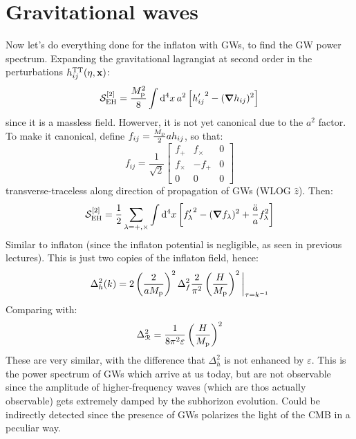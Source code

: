 \section{Gravitational waves}

Now let's do everything done for the inflaton with GWs, to find the GW power spectrum. Expanding the gravitational lagrangiat at second order in the perturbations $ h_{ij}^\text{TT}(\eta , \mathbf{x}) $:
\begin{equation*}
  \mathcal{S}_\text{EH}^{[2]} = \frac{M_\text{p}^2}{8} \int \mathrm{d}^4x \, a^2 \left[ {h_{ij}'}^2 - (\boldsymbol{\nabla} h_{ij})^2 \right]
\end{equation*}
since it is a massless field. Howerver, it is not yet canonical due to the $ a^2 $ factor. To make it canonical, define $ f_{ij} = \frac{M_\text{p}}{2} a h_{ij} $, so that:
\begin{equation*}
  f_{ij} = \frac{1}{\sqrt{2}}
  \begin{bmatrix}
    f_+ & f_\times & 0 \\
    f_\times & - f_+ & 0 \\
    0 & 0 & 0
  \end{bmatrix}
\end{equation*}
transverse-traceless along direction of propagation of GWs (WLOG $ \hat{z} $). Then:
\begin{equation*}
  \mathcal{S}_\text{EH}^{[2]} = \frac{1}{2} \sum_{\lambda = + , \times} \int \mathrm{d}^4x \left[ {f_\lambda'}^2 - (\boldsymbol{\nabla} f_\lambda)^2 + \frac{\ddot{a}}{a} f_\lambda^2 \right]
\end{equation*}
Similar to inflaton (since the inflaton potential is negligible, as seen in previous lectures). This is just two copies of the inflaton field, hence:
\begin{equation}
  \Delta^2_h(k) = 2 \left( \frac{2}{a M_\text{p}} \right)^2 \Delta^2_f \frac{2}{\pi^2} \left( \frac{H}{M_\text{p}} \right)^2 \bigg\vert_{\tau = k^{-1}}
\end{equation}
Comparing with:
\begin{equation*}
  \Delta^2_\EuScript{R} = \frac{1}{8 \pi^2 \varepsilon} \left( \frac{H}{M_\text{p}} \right)^2
\end{equation*}
These are very similar, with the difference that $ \Delta^2_h $ is not enhanced by $ \varepsilon $. This is the power spectrum of GWs which arrive at us today, but are not observable since the amplitude of higher-frequency waves (which are thos actually observable) gets extremely damped by the subhorizon evolution. Could be indirectly detected since the presence of GWs polarizes the light of the CMB in a peculiar way.


